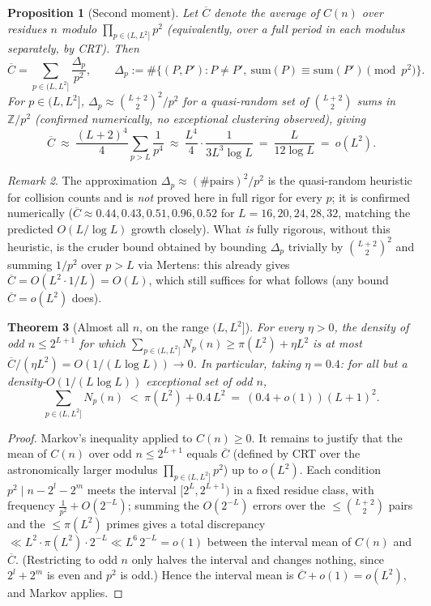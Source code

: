 \documentclass[11pt]{article}
\theoremstyle{plain}
\newtheorem{theorem}{Theorem}[section]
\newtheorem{proposition}[theorem]{Proposition}
\theoremstyle{definition}
\theoremstyle{remark}
\newtheorem{remark}[theorem]{Remark}
\newcommand{\Z}{\mathbb{Z}}
\begin{document}
\begin{proposition}[Second moment]\label{prop:secondmoment}
Let $\overline C$ denote the average of $C(n)$ over residues $n$ modulo
$\prod_{p\in(L,L^2]}p^2$ (equivalently, over a full period in each modulus
separately, by CRT). Then
\[
\overline C=\sum_{p\in(L,L^2]}\frac{\Delta_p}{p^2},\qquad
\Delta_p:=\#\{(P,P'):P\ne P',\ \mathrm{sum}(P)\equiv\mathrm{sum}(P')\!\!\pmod{p^2}\}.
\]
For $p\in(L,L^2]$, $\Delta_p\approx\binom{L+2}{2}^2/p^2$ for a quasi-random
set of $\binom{L+2}{2}$ sums in $\Z/p^2$ (confirmed numerically, no
exceptional clustering observed), giving
\[
\overline C\ \approx\ \frac{(L+2)^4}{4}\sum_{p>L}\frac1{p^4}
\ \approx\ \frac{L^4}4\cdot\frac1{3L^3\log L}\ =\ \frac{L}{12\log L}\ =\ o(L^2).
\]
\end{proposition}

\begin{remark}
The approximation $\Delta_p\approx(\#\mathrm{pairs})^2/p^2$ is the
quasi-random heuristic for collision counts and is \emph{not} proved here in
full rigor for every $p$; it is confirmed numerically
($\overline C\approx0.44,0.43,0.51,0.96,0.52$ for $L=16,20,24,28,32$, matching
the predicted $O(L/\log L)$ growth closely). What \emph{is} fully rigorous,
without this heuristic, is the cruder bound obtained by bounding $\Delta_p$
trivially by $\binom{L+2}{2}^2$ and summing $1/p^2$ over $p>L$ via Mertens:
this already gives $\overline C=O(L^2\cdot1/L)=O(L)$, which still suffices
for what follows (any bound $\overline C=o(L^2)$ does).
\end{remark}

\begin{theorem}[Almost all $n$, on the range $(L,L^2{]}$]\label{thm:almost}
For every $\eta>0$, the density of odd $n\le2^{L+1}$ for which
$\sum_{p\in(L,L^2]}N_p(n)\ge\pi(L^2)+\eta L^2$ is at most
$\overline C/(\eta L^2)=O(1/(L\log L))\to0$. In particular, taking
$\eta=0.4$: for all but a density-$O(1/(L\log L))$ exceptional set of odd
$n$,
\[
\sum_{p\in(L,L^2]}N_p(n)\ <\ \pi(L^2)+0.4\,L^2\ =\ (0.4+o(1))(L+1)^2.
\]
\end{theorem}
\begin{proof}
Markov's inequality applied to $C(n)\ge0$. It remains to justify that the mean
of $C(n)$ over odd $n\le2^{L+1}$ equals $\overline C$ (defined by CRT over the
astronomically larger modulus $\prod_{p\in(L,L^2]}p^2$) up to $o(L^2)$. Each
condition $p^2\mid n-2^l-2^m$ meets the interval $[2^L,2^{L+1})$ in a fixed
residue class, with frequency $\tfrac1{p^2}+O(2^{-L})$; summing the $O(2^{-L})$
errors over the $\le\binom{L+2}{2}$ pairs and the $\le\pi(L^2)$ primes gives a
total discrepancy $\ll L^2\cdot\pi(L^2)\cdot2^{-L}\ll L^6\,2^{-L}=o(1)$ between
the interval mean of $C(n)$ and $\overline C$. (Restricting to odd $n$ only
halves the interval and changes nothing, since $2^l+2^m$ is even and $p^2$ is
odd.) Hence the interval mean is $\overline C+o(1)=o(L^2)$, and Markov applies.
\end{proof}
\end{document}
